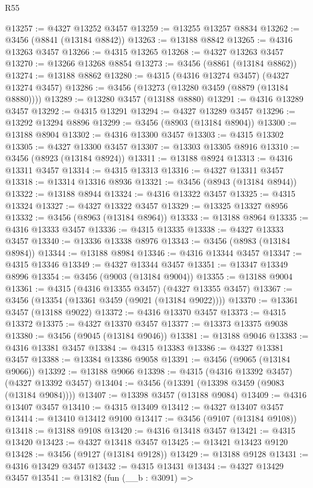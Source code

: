 \begin{lexlean}{R55}
\begin{coremodule}
@13257 := @4327 @13252 @3457
@13259 := @13255 @13257 @8834
@13262 := @3456 (@8841 (@13184 @8842))
@13263 := @13188 @8842
@13265 := @4316 @13263 @3457
@13266 := @4315 @13265
@13268 := @4327 @13263 @3457
@13270 := @13266 @13268 @8854
@13273 := @3456 (@8861 (@13184 @8862))
@13274 := @13188 @8862
@13280 := @4315 (@4316 @13274 @3457) (@4327 @13274 @3457)
@13286 := @3456 (@13273 (@13280 @3459 (@8879 (@13184 @8880))))
@13289 := @13280 @3457 (@13188 @8880)
@13291 := @4316 @13289 @3457
@13292 := @4315 @13291
@13294 := @4327 @13289 @3457
@13296 := @13292 @13294 @8896
@13299 := @3456 (@8903 (@13184 @8904))
@13300 := @13188 @8904
@13302 := @4316 @13300 @3457
@13303 := @4315 @13302
@13305 := @4327 @13300 @3457
@13307 := @13303 @13305 @8916
@13310 := @3456 (@8923 (@13184 @8924))
@13311 := @13188 @8924
@13313 := @4316 @13311 @3457
@13314 := @4315 @13313
@13316 := @4327 @13311 @3457
@13318 := @13314 @13316 @8936
@13321 := @3456 (@8943 (@13184 @8944))
@13322 := @13188 @8944
@13324 := @4316 @13322 @3457
@13325 := @4315 @13324
@13327 := @4327 @13322 @3457
@13329 := @13325 @13327 @8956
@13332 := @3456 (@8963 (@13184 @8964))
@13333 := @13188 @8964
@13335 := @4316 @13333 @3457
@13336 := @4315 @13335
@13338 := @4327 @13333 @3457
@13340 := @13336 @13338 @8976
@13343 := @3456 (@8983 (@13184 @8984))
@13344 := @13188 @8984
@13346 := @4316 @13344 @3457
@13347 := @4315 @13346
@13349 := @4327 @13344 @3457
@13351 := @13347 @13349 @8996
@13354 := @3456 (@9003 (@13184 @9004))
@13355 := @13188 @9004
@13361 := @4315 (@4316 @13355 @3457) (@4327 @13355 @3457)
@13367 := @3456 (@13354 (@13361 @3459 (@9021 (@13184 @9022))))
@13370 := @13361 @3457 (@13188 @9022)
@13372 := @4316 @13370 @3457
@13373 := @4315 @13372
@13375 := @4327 @13370 @3457
@13377 := @13373 @13375 @9038
@13380 := @3456 (@9045 (@13184 @9046))
@13381 := @13188 @9046
@13383 := @4316 @13381 @3457
@13384 := @4315 @13383
@13386 := @4327 @13381 @3457
@13388 := @13384 @13386 @9058
@13391 := @3456 (@9065 (@13184 @9066))
@13392 := @13188 @9066
@13398 := @4315 (@4316 @13392 @3457) (@4327 @13392 @3457)
@13404 := @3456 (@13391 (@13398 @3459 (@9083 (@13184 @9084))))
@13407 := @13398 @3457 (@13188 @9084)
@13409 := @4316 @13407 @3457
@13410 := @4315 @13409
@13412 := @4327 @13407 @3457
@13414 := @13410 @13412 @9100
@13417 := @3456 (@9107 (@13184 @9108))
@13418 := @13188 @9108
@13420 := @4316 @13418 @3457
@13421 := @4315 @13420
@13423 := @4327 @13418 @3457
@13425 := @13421 @13423 @9120
@13428 := @3456 (@9127 (@13184 @9128))
@13429 := @13188 @9128
@13431 := @4316 @13429 @3457
@13432 := @4315 @13431
@13434 := @4327 @13429 @3457
@13541 := @13182
    (fun (__b : @3091) =>

\end{coremodule}
\end{lexlean}
